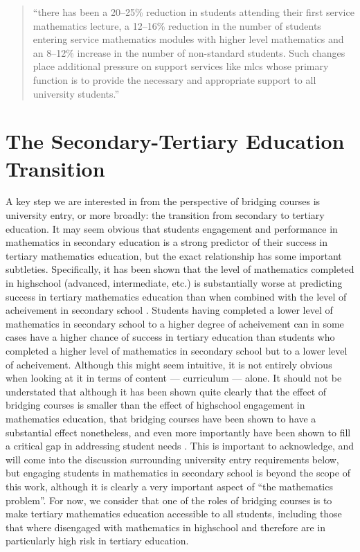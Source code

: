 \documentclass[twoside,12pt,a4paper]{report}
\begin{document}
\begin{quote}
	``there has been a 20–25\% reduction in students attending their first
		service mathematics lecture, a 12–16\% reduction in the number of students entering
		service mathematics modules with higher level mathematics and an 8–12\% increase in
		the number of non-standard students. Such changes place additional pressure on
		support services like \gls{mlc}s whose primary function is to provide the necessary and
		appropriate support to all university students.''  \hfill \cite{Johnson2016}
\end{quote}

\section{The Secondary-Tertiary Education Transition}

A key step we are interested in from the perspective of bridging courses is university entry, or more broadly: the transition from secondary to tertiary education. It may seem obvious that students engagement and performance in mathematics in secondary education is a strong predictor of their success in tertiary mathematics education, but the exact relationship has some important subtleties. Specifically, it has been shown that the level of mathematics completed in highschool (advanced, intermediate, etc.) is substantially worse at predicting success in tertiary mathematics education than when combined with the level of acheivement in secondary school \cite{Kajander2005, Nicholas2015b}.
Students having completed a lower level of mathematics in secondary school to a higher degree of acheivement can in some cases have a higher chance of success in tertiary education than students who completed a higher level of mathematics in secondary school but to a lower level of acheivement. Although this might seem intuitive, it is not entirely obvious when looking at it in terms of content --- curriculum --- alone. It should not be understated that although it has been shown quite clearly that the effect of bridging courses is smaller than the effect of highschool engagement in mathematics education, that bridging courses have been shown to have a substantial effect nonetheless, and even more importantly have been shown to fill a critical gap in addressing student needs \cite{MacGillivray2009}. This is important to acknowledge, and will come into the discussion surrounding university entry requirements below, but engaging students in mathematics in secondary school is beyond the scope of this work, although it is clearly a very important aspect of ``the mathematics problem''. For now, we consider that one of the roles of bridging courses is to make tertiary mathematics education accessible to all students, including those that where disengaged with mathematics in highschool and therefore are in particularly high risk in tertiary education.
\end{document}
